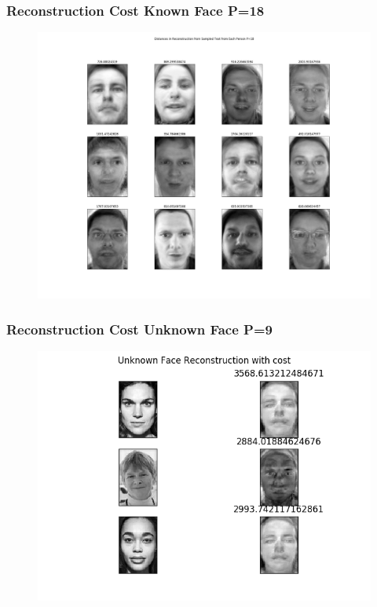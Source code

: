 \documentclass[11pt]{beamer}
\begin{document}
\begin{frame}
\frametitle{Reconstruction Cost Known Face P=18}
\begin{figure}
\includegraphics[width=.95\textwidth]{reconstruction_cost_18.png}
\end{figure}
\end{frame}


\begin{frame}
\frametitle{Reconstruction Cost Unknown Face P=9}
\begin{figure}
\includegraphics[width=.95\textwidth]{Unknown_Face_cost_P_9.png}
\end{figure}
\end{frame}
\end{document}

